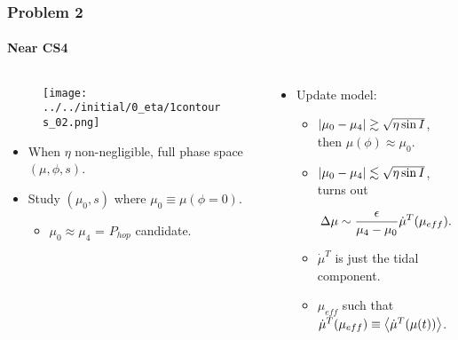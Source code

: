 \documentclass[dvipsnames, 11pt]{beamer}
\DeclarePairedDelimiter\abs{\lvert}{\rvert}
\DeclarePairedDelimiter\ev{\langle}{\rangle}
\DeclarePairedDelimiter\p{\lparen}{\rparen}
\begin{document}
\begin{frame}
    \frametitle{Problem 2}
    \framesubtitle{Near CS4}

    \begin{columns}
        \begin{column}{0.5\textwidth}
            \begin{figure}[t]
                \centering
                \texttt{[image: ../../initial/0\_eta/1contours\_02.png]}
            \end{figure}

            \begin{itemize}
                \item When $\eta$ non-negligible, full phase space $(\mu, \phi,
                    s)$.

                \item Study $(\mu_0, s)$ where $\mu_0 \equiv \mu(\phi = 0)$.
                    \begin{itemize}
                        \item $\mu_0 \approx \mu_4$ = $P_{hop}$ candidate.
                    \end{itemize}
            \end{itemize}
        \end{column}
        \begin{column}{0.5\textwidth}
            \begin{itemize}
                \item Update model:
                    \begin{itemize}
                        \item $\abs*{\mu_0 - \mu_4} \gtrsim \sqrt{\eta \sin I}$,
                            then $\mu(\phi) \approx \mu_0$.

                        \item $\abs*{\mu_0 - \mu_4} \lesssim
                            \sqrt{\eta \sin I}$, turns out

                            \begin{equation}
                                \Delta \mu \sim
                                    \frac{\epsilon}{\mu_4 - \mu_0}
                                        \dot{\mu}^{T}\p*{\mu_{eff}}.
                            \end{equation}

                        \item $\dot{\mu}^{T}$ is just the tidal component.

                        \item $\mu_{eff}$ such that $\dot{\mu}^{T}(\mu_{eff})
                            \equiv \ev*{\dot{\mu}^{T}(\mu(t))}$.
                    \end{itemize}
            \end{itemize}
        \end{column}
    \end{columns}
\end{frame}
\end{document}
